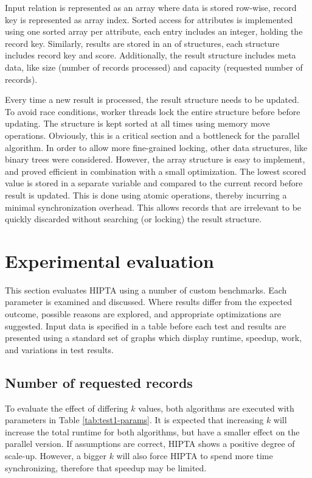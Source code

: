 Input relation is represented as an array where data is stored
row-wise, record key is represented as array index. Sorted access for
attributes is implemented using one sorted array per attribute, each
entry includes an integer, holding the record key. Similarly, results
are stored in an of structures, each structure includes record key and
score. Additionally, the result structure includes meta data, like
size (number of records processed) and capacity (requested number of
records).

Every time a new result is processed, the result structure needs to be
updated. To avoid race conditions, worker threads lock the entire
structure before before updating. The structure is kept sorted at all
times using memory move operations. Obviously, this is a critical
section and a bottleneck for the parallel algorithm. In order to allow
more fine-grained locking, other data structures, like binary trees
were considered. However, the array structure is easy to implement,
and proved efficient in combination with a small optimization. The
lowest scored value is stored in a separate variable and compared to
the current record before result is updated. This is done using atomic
operations, thereby incurring a minimal synchronization overhead.
This allows records that are irrelevant to be quickly discarded
without searching (or locking) the result structure.

\section{Experimental evaluation}

This section evaluates HIPTA using a number of custom benchmarks. Each
parameter is examined and discussed. Where results differ from the
expected outcome, possible reasons are explored, and appropriate
optimizations are suggested. Input data is specified in a table before
each test and results are presented using a standard set of graphs
which display runtime, speedup, work, and variations in test results.

\subsection{Number of requested records}
\label{sec:test1}

To evaluate the effect of differing $k$ values, both algorithms are
executed with parameters in Table \ref{tab:test1-params}. It is
expected that increasing $k$ will increase the total runtime for both
algorithms, but have a smaller effect on the parallel version. If
assumptions are correct, HIPTA shows a positive degree of scale-up.
However, a bigger $k$ will also force HIPTA to spend more time
synchronizing, therefore that speedup may be limited.

